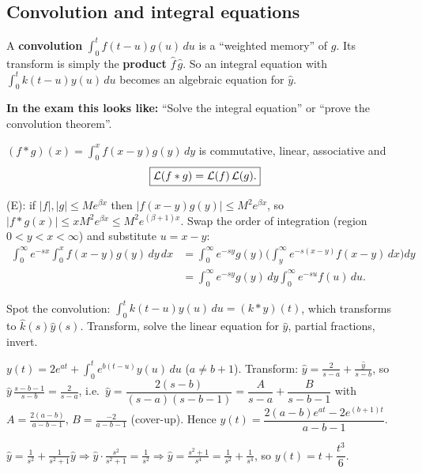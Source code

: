 \subsection{Convolution and integral equations \texorpdfstring{}{}}\label{sec:conv}\label{ss:3-6}
\begin{plainbox}
A \textbf{convolution} $\int_0^tf(t-u)g(u)\,du$ is a ``weighted memory'' of $g$. Its transform is simply the \textbf{product} $\hat f\,\hat g$.
So an integral equation with $\int_0^tk(t-u)y(u)\,du$ becomes an algebraic equation for $\hat y$.
\par\smallskip\textbf{In the exam this looks like:} ``Solve the integral equation'' or ``prove the convolution theorem''.
\end{plainbox}
\begin{thmbox}[title={Proposition 0.28 (Laplace convolution)}]
$(f*g)(x)=\displaystyle\int_0^xf(x-y)g(y)\,dy$ is commutative, linear, associative and
\[\boxed{\mathcal{L}(f*g)=\mathcal{L}(f)\,\mathcal{L}(g).}\]
\end{thmbox}
\begin{proofbox}[title={Proof of $\Lap(f*g)=\Lap f\,\Lap g$ \fr{101--102}}]
(E): if $|f|,|g|\le Me^{\beta x}$ then $|f(x-y)g(y)|\le M^2e^{\beta x}$, so $|f*g(x)|\le xM^2e^{\beta x}\le M^2e^{(\beta+1)x}$.
Swap the order of integration (region $0<y<x<\infty$) and substitute $u=x-y$:
\begin{align*}\int_0^\infty e^{-sx}\int_0^xf(x-y)g(y)\,dy\,dx&=\int_0^\infty e^{-sy}g(y)\Big(\int_y^\infty e^{-s(x-y)}f(x-y)\,dx\Big)dy\\&=\int_0^\infty e^{-sy}g(y)\,dy\int_0^\infty e^{-su}f(u)\,du.\end{align*}
\end{proofbox}
\begin{methodbox}[title={Method: integral equations}]
Spot the convolution: $\int_0^tk(t-u)y(u)\,du=(k*y)(t)$, which transforms to $\hat k(s)\hat y(s)$. Transform, solve the linear equation for $\hat y$, partial fractions, invert.
\end{methodbox}
\begin{workbox}[title={Worked example \fr{105--106}}]
$y(t)=2e^{at}+\int_0^te^{b(t-u)}y(u)\,du$ ($a\neq b+1$). Transform: $\hat y=\frac2{s-a}+\frac{\hat y}{s-b}$, so
$\hat y\,\frac{s-b-1}{s-b}=\frac{2}{s-a}$, i.e.\ $\hat y=\dfrac{2(s-b)}{(s-a)(s-b-1)}=\dfrac{A}{s-a}+\dfrac{B}{s-b-1}$ with
$A=\frac{2(a-b)}{a-b-1}$, $B=\frac{-2}{a-b-1}$ (cover-up). Hence $y(t)=\dfrac{2(a-b)e^{at}-2e^{(b+1)t}}{a-b-1}$.
\end{workbox}
\begin{workbox}[title={Worked example: $y(t)=t+\int_0^t\sin(t-u)\,y(u)\,du$}]
$\hat y=\frac1{s^2}+\frac{1}{s^2+1}\hat y\Rightarrow\hat y\cdot\frac{s^2}{s^2+1}=\frac1{s^2}\Rightarrow\hat y=\frac{s^2+1}{s^4}=\frac1{s^2}+\frac1{s^4}$, so $y(t)=t+\dfrac{t^3}{6}$.
\end{workbox}

